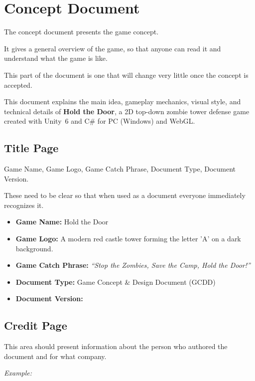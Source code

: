 \section{Concept Document}

\begin{guidance}
The concept document presents the game concept.

It gives a general overview of the game, so that anyone can read it and understand what the game is like.

This part of the document is one that will change very little once the concept is accepted.
\end{guidance}
This document explains the main idea, gameplay mechanics, visual style, and technical details of \textbf{Hold the Door}, a 2D top-down zombie tower defense game created with Unity~6 and C\# for PC (Windows) and WebGL.

\subsection{Title Page}

\begin{guidance}
Game Name, Game Logo, Game Catch Phrase, Document Type, Document Version.

These need to be clear so that when used as a document everyone immediately recognizes it.
\end{guidance}
\begin{itemize}[label=\textbullet]
  \item \textbf{Game Name:} Hold the Door
  \item \textbf{Game Logo:} A modern red castle tower forming the letter 'A' on a dark background.
  \item \textbf{Game Catch Phrase:} \textit{``Stop the Zombies, Save the Camp, Hold the Door!''}
  \item \textbf{Document Type:} Game Concept \& Design Document (GCDD)
  \item \textbf{Document Version:} \DocVersion
\end{itemize}

\subsection{Credit Page}

\begin{guidance}
This area should present information about the person who authored the document and for what company.

\textit{Example:}
\end{guidance}

